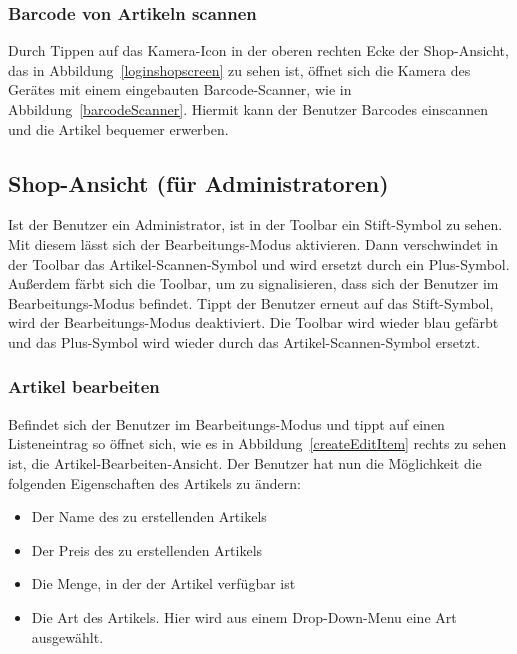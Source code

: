 
\subsubsection{Barcode von Artikeln scannen} \label{subsubsec:shop-scan-item}

Durch Tippen auf das Kamera-Icon in der oberen rechten Ecke der Shop-Ansicht, das in Abbildung~\ref{loginshopscreen} zu sehen ist, öffnet sich die Kamera des Gerätes mit einem eingebauten Barcode-Scanner, wie in Abbildung~\ref{barcodeScanner}.
Hiermit kann der Benutzer Barcodes einscannen und die Artikel bequemer erwerben.


\subsection{Shop-Ansicht (für Administratoren)} \label{subsec:shop-screen-admin}

Ist der Benutzer ein Administrator, ist in der Toolbar ein Stift-Symbol zu sehen.
Mit diesem lässt sich der Bearbeitungs-Modus aktivieren.
Dann verschwindet in der Toolbar das Artikel-Scannen-Symbol und wird ersetzt durch ein Plus-Symbol.
Außerdem färbt sich die Toolbar, um zu signalisieren, dass sich der Benutzer im Bearbeitungs-Modus befindet.
Tippt der Benutzer erneut auf das Stift-Symbol, wird der Bearbeitungs-Modus deaktiviert.
Die Toolbar wird wieder blau gefärbt und das Plus-Symbol wird wieder durch das Artikel-Scannen-Symbol ersetzt.

\subsubsection{Artikel bearbeiten} \label{subsubsec:shop-edit-items}

Befindet sich der Benutzer im Bearbeitungs-Modus und tippt auf einen Listeneintrag so öffnet sich, wie es in Abbildung~\ref{createEditItem} rechts zu sehen ist, die Artikel-Bearbeiten-Ansicht.
Der Benutzer hat nun die Möglichkeit die folgenden Eigenschaften des Artikels zu ändern:

\begin{itemize}
	\item Der Name des zu erstellenden Artikels

	\item Der Preis des zu erstellenden Artikels

	\item Die Menge, in der der Artikel verfügbar ist

	\item Die Art des Artikels.
	Hier wird aus einem Drop-Down-Menu eine Art ausgewählt.
\end{itemize}

